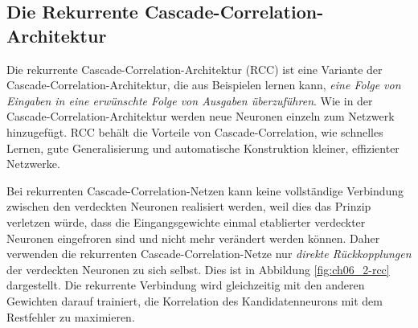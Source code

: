 \subsection*{Die Rekurrente Cascade-Correlation-Architektur}
Die rekurrente Cascade-Correlation-Architektur (RCC) ist eine
Variante der Cascade-Correlation-Architektur, die aus Beispielen lernen kann, \emph{eine Folge von Eingaben in eine erwünschte Folge von Ausgaben überzuführen}.
Wie in der Cascade-Correlation-Architektur werden neue Neuronen einzeln zum Netzwerk hinzugefügt. RCC behält die Vorteile von Cascade-Correlation, wie schnelles Lernen, gute Generalisierung und automatische Konstruktion kleiner, effizienter Netzwerke.

Bei rekurrenten Cascade-Correlation-Netzen kann keine vollständige Verbindung zwischen den verdeckten Neuronen realisiert werden, weil dies das Prinzip verletzen würde, dass die Eingangsgewichte einmal etablierter verdeckter Neuronen eingefroren sind und nicht mehr verändert werden können. Daher verwenden die rekurrenten Cascade-Correlation-Netze nur \emph{direkte Rückkopplungen} der verdeckten Neuronen zu sich selbst.
Dies ist in Abbildung \ref{fig:ch06_2-rcc} dargestellt.
Die rekurrente Verbindung wird gleichzeitig mit den anderen Gewichten darauf trainiert, die Korrelation des Kandidatenneurons mit dem Restfehler zu maximieren.

